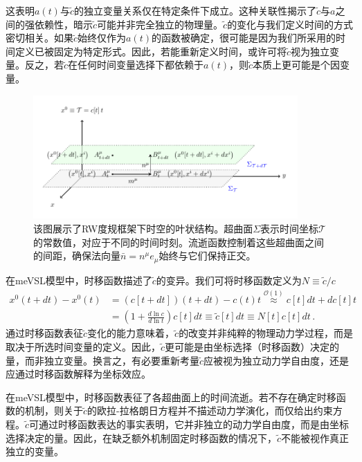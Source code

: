 \documentclass[jkps,preprint,fleqn]{revtex4}
\newcommand{\tc}{\tilde{c}}
\begin{document}
这表明$a(t)$与$\tc$的独立变量关系仅在特定条件下成立。这种关联性揭示了$\tc$与$a$之间的强依赖性，暗示$\tc$可能并非完全独立的物理量。$\tc$的变化与我们定义时间的方式密切相关。如果$\tc$始终仅作为$a(t)$的函数被确定，很可能是因为我们所采用的时间定义已被固定为特定形式。因此，若能重新定义时间，或许可将$\tc$视为独立变量。反之，若$\tc$在任何时间变量选择下都依赖于$a(t)$，则$\tc$本质上更可能是个因变量。

\begin{figure}
	\begin{center}
	\includegraphics[width=0.9\textwidth]{Fig2.pdf}
	\caption{该图展示了RW度规框架下时空的叶状结构。超曲面$\Sigma$表示时间坐标$\mathcal{T}$的常数值，对应于不同的时间时刻。流逝函数控制着这些超曲面之间的间距，确保法向量$\bar{n} = n^{\mu} e_{\mu}$始终与它们保持正交。}
	\label{Fig2}
	\end{center}
\end{figure}

在meVSL模型中，时移函数描述了$\tc$的变异。我们可将时移函数定义为$N \equiv \tc/c$
\begin{align}
x^{0}(t+dt) - x^{0}(t) &=  \left( c[t+dt] \right) \left( t+dt \right) - c(t) t \overset{\mathcal{O}(1)}{\approx} c[t] dt + dc[t] t \nonumber \\
	&= \left( 1 + \frac{d \ln c}{d \ln t} \right) c[t] dt \equiv \tilde{c}[t] dt \equiv N[t] c[t] dt \label{NmeVSL} \,.
\end{align}
通过时移函数表征$\tc$变化的能力意味着，$\tc$的改变并非纯粹的物理动力学过程，而是取决于所选时间变量的定义。因此，$\tc$更可能是由坐标选择（时移函数）决定的量，而非独立变量。换言之，有必要重新考量$\tc$应被视为独立动力学自由度，还是应通过时移函数解释为坐标效应。

在meVSL模型中，时移函数表征了各超曲面上的时间流逝。若不存在确定时移函数的机制，则关于$\tc$的欧拉-拉格朗日方程并不描述动力学演化，而仅给出约束方程。$\tc$可通过时移函数表达的事实表明，它并非独立的动力学自由度，而是由坐标选择决定的量。因此，在缺乏额外机制固定时移函数的情况下，$\tc$不能被视作真正独立的变量。
\end{document}
